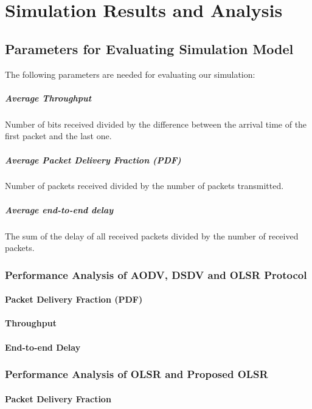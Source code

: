 \documentclass[12pt,a4paper]{report}
\begin{document}
\chapter{Simulation Results and Analysis}

\section{Parameters for Evaluating Simulation Model}
The following parameters are needed for evaluating our simulation:
\paragraph{Average Throughput}
Number of bits received divided by the difference between the arrival time of the first packet and the last one.
\paragraph{Average Packet Delivery Fraction (PDF)}
Number of packets received divided by the number of packets transmitted.
\paragraph{Average end-to-end delay}
 The sum of the delay of all received packets divided by the number of received packets.
\subsection{Performance Analysis of AODV, DSDV and OLSR Protocol}
\subsubsection{Packet Delivery Fraction (PDF)}

\subsubsection{Throughput}
\subsubsection{End-to-end Delay}

\subsection{Performance Analysis of OLSR and Proposed OLSR}
\subsubsection{Packet Delivery Fraction}
\end{document}
